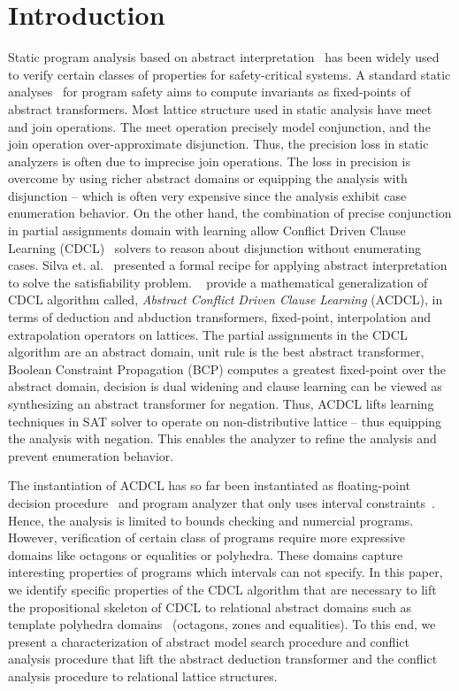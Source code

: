 \section{Introduction}
%
Static program analysis based on abstract 
interpretation~\cite{DBLP:conf/emsoft/Cousot07} has been widely used to
verify certain classes of properties for safety-critical systems.  A 
standard static analyses~\cite{se2011} for program safety aims to compute 
invariants as fixed-points of abstract transformers.  Most lattice structure 
used in static analysis have meet and join operations.  The meet operation 
precisely model conjunction, and the join operation over-approximate 
disjunction. Thus, the precision loss in static analyzers is often 
due to imprecise join operations. The loss in precision is overcome 
by using richer abstract domains or equipping the analysis with disjunction --
which is often very expensive since the analysis exhibit case enumeration 
behavior. 
On the other hand, the combination of precise conjunction in partial assignments 
domain with learning allow Conflict Driven Clause Learning (CDCL)~\cite{cdcl} 
solvers to reason about disjunction without enumerating cases.  
Silva et. al.~\cite{tacas12, sas12, dhk2013-popl} presented 
a formal recipe for applying abstract interpretation~\cite{se2011} to solve the 
satisfiability problem.  ~\cite{sas12} provide a mathematical generalization 
of CDCL algorithm called, {\em Abstract Conflict Driven Clause Learning} (ACDCL), 
in terms of deduction and abduction transformers, fixed-point, interpolation 
and extrapolation operators on lattices.  The partial assignments in the 
CDCL algorithm are an abstract domain, unit rule is the best abstract 
transformer,  Boolean Constraint Propagation (BCP) computes a greatest fixed-point 
over the abstract domain, decision is dual widening and clause learning can be 
viewed as synthesizing an abstract transformer for negation.  Thus, ACDCL 
lifts learning techniques in SAT solver to operate on non-distributive 
lattice -- thus equipping the analysis with negation. This enables the 
analyzer to refine the analysis and prevent enumeration behavior.

The instantiation of ACDCL has so far been instantiated as floating-point
decision procedure~\cite{DBLP:journals/fmsd/BrainDGHK14} and program analyzer 
that only uses interval constraints~\cite{tacas12}.  Hence, the analysis is 
limited to bounds checking and numercial programs.  However, verification of 
certain class of programs require more expressive domains like octagons or 
equalities or polyhedra.  These domains capture interesting properties of
programs which intervals can not specify.  In this paper, we identify specific 
properties of the CDCL algorithm that are necessary to lift the propositional 
skeleton of CDCL to relational abstract domains such as template polyhedra 
domains~\cite{sriram} (octagons, zones and equalities).  To this end, we 
present a characterization of abstract model search procedure and conflict 
analysis procedure that lift the abstract deduction transformer and the conflict 
analysis procedure to relational lattice structures. 
